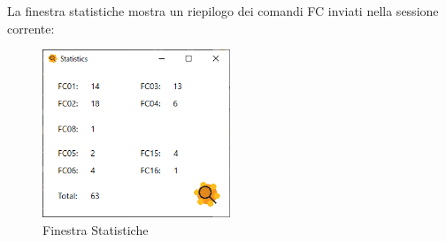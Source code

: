 La finestra statistiche mostra un riepilogo dei comandi FC inviati nella sessione corrente:

\begin{figure}[H]
\centering
\includegraphics[width=0.5\textwidth]{../Img/Finestra_Statistiche.PNG}
\caption{Finestra Statistiche}
\end{figure}